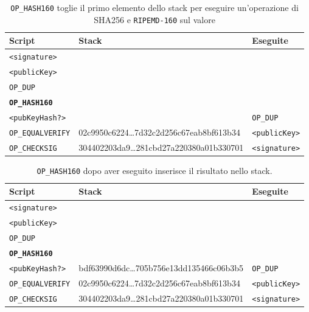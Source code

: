 \begin{table}[H]
    \centering
    \begin{tabular}{p{3cm}|p{7.7cm}|p{3cm}}
        Script & Stack & Eseguite\\
        \hline
        \texttt{<signature>}          & &\\
        \texttt{<publicKey>}          & &\\
        \texttt{OP\_DUP}              & &\\
        \texttt{\textbf{OP\_HASH160}} & &\\
        \texttt{<pubKeyHash?>}        &                                            & \texttt{OP\_DUP}\\
        \texttt{OP\_EQUALVERIFY}      & 02c9950c6224\dots7d32c2d256c67eab8bf613b34 & \texttt{<publicKey>}\\
        \texttt{OP\_CHECKSIG}         & 304402203da9\dots281cbd27a220380a01b330701 & \texttt{<signature>}\\
    \end{tabular}
    \caption{\texttt{OP\_HASH160} toglie il primo elemento dello stack per eseguire un'operazione di SHA256 e \texttt{RIPEMD-160} sul valore}
\end{table}

\begin{table}[H]
    \centering
    \begin{tabular}{p{3cm}|p{7.7cm}|p{3cm}}
        Script & Stack & Eseguite\\
        \hline
        \texttt{<signature>}            & &\\
        \texttt{<publicKey>}            & &\\
        \texttt{OP\_DUP}                & &\\
        \texttt{\textbf{OP\_HASH160}}   & &\\
        \texttt{<pubKeyHash?>}          & bdf63990d6dc\dots705b756e13dd135466c06b3b5 & \texttt{OP\_DUP}\\
        \texttt{OP\_EQUALVERIFY}        & 02c9950c6224\dots7d32c2d256c67eab8bf613b34 & \texttt{<publicKey>}\\
        \texttt{OP\_CHECKSIG}           & 304402203da9\dots281cbd27a220380a01b330701 & \texttt{<signature>}\\
    \end{tabular}
    \caption{\texttt{OP\_HASH160} dopo aver eseguito inserisce il risultato nello stack.}
\end{table}

